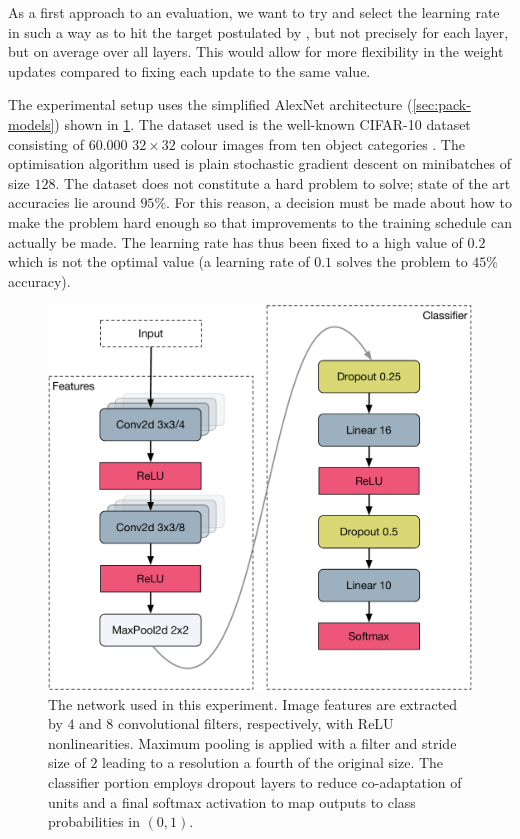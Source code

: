 As a first approach to an evaluation, we want to try and select the learning
rate in such a way as to hit the target postulated by
\citeauthor{karpathycs231n}, but not precisely for each layer, but on average
over all layers. This would allow for more flexibility in the weight updates
compared to fixing each update to the same value.

The experimental setup uses the simplified AlexNet architecture
(\cref{sec:pack-models}) shown in \cref{fig:alexnetmini}. The dataset used is
the well-known CIFAR-10 dataset consisting of $60.000$ $32\times32$ colour images
from ten object categories \citep{krizhevsky2009learning}. The optimisation
algorithm used is plain stochastic gradient descent on minibatches of size $128$. The
dataset does not constitute a hard problem to solve; state of the art accuracies
lie around $95\%$. For this reason, a decision must be made about how to make
the problem hard enough so that improvements to the training schedule can
actually be made. The learning rate has thus been fixed to a high value of $0.2$
which is not the optimal value (a learning rate of $0.1$ solves the problem to
$45\%$ accuracy).

\begin{figure}
    \centering
    \includegraphics[width=\linewidth]{gfx/diagrams/neural_network/alexnetmini.pdf}
    \caption[Simplified AlexNet architecture]{The network used in this
    experiment. Image features are extracted by $4$ and $8$ convolutional
    filters, respectively, with ReLU nonlinearities. Maximum pooling is applied
    with a filter and stride size of $2$ leading to a resolution a fourth of the
    original size. The classifier portion employs dropout layers to reduce
    co-adaptation of units and a final softmax activation to map outputs to
    class probabilities in $(0,1)$.}
    \label{fig:alexnetmini}
\end{figure}

